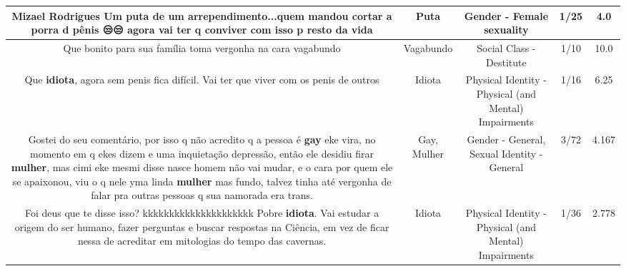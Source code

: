 \documentclass[11pt]{article}
\newlength\mylength
\begin{document}
\begin{center}
\begin{longtable}{|C{.65\mylength}|C{.30\mylength}|C{.12\mylength}|C{.12\mylength}|C{.12\mylength}|}
  \small Mizael Rodrigues  Um \textbf{puta} de um arrependimento...quem mandou cortar a porra d pênis 😒😒 agora vai ter q conviver com isso p resto da vida\normalsize   & Puta & Gender - Female sexuality & 1/25 & 4.0 \\  \hline
  \small Que    bonito para  sua   família    toma  vergonha  na  cara   vagabundo\normalsize   & Vagabundo & Social Class - Destitute & 1/10 & 10.0 \\  \hline
  \small Que \textbf{idiota}, agora sem penis fica difícil. Vai ter que viver com os penis de outros\normalsize   & Idiota & Physical Identity - Physical (and Mental) Impairments & 1/16 & 6.25 \\  \hline
  \small Gostei do seu comentário, por isso q não acredito q a pessoa é \textbf{gay} eke vira, no momento em q ekes dizem e uma inquietação depressão, então ele desidiu firar \textbf{mulher}, mas cimi eke mesmi disse nasce homem não vai mudar, e o cara por quem ele se apaixonou, viu o q nele yma linda \textbf{mulher} mas fundo, talvez tinha até vergonha de falar pra outras pessoas q sua namorada era trans.\normalsize   & Gay, Mulher & Gender - General, Sexual Identity - General & 3/72 & 4.167 \\  \hline
  \small Foi deus que te disse isso? kkkkkkkkkkkkkkkkkkkkk Pobre \textbf{idiota}. Vai estudar a origem do ser humano, fazer perguntas e buscar respostas na Ciência, em vez de ficar nessa de acreditar em mitologias do tempo das cavernas.\normalsize   & Idiota & Physical Identity - Physical (and Mental) Impairments & 1/36 & 2.778 \\  \hline

\end{longtable}
\end{center}
\end{document}
